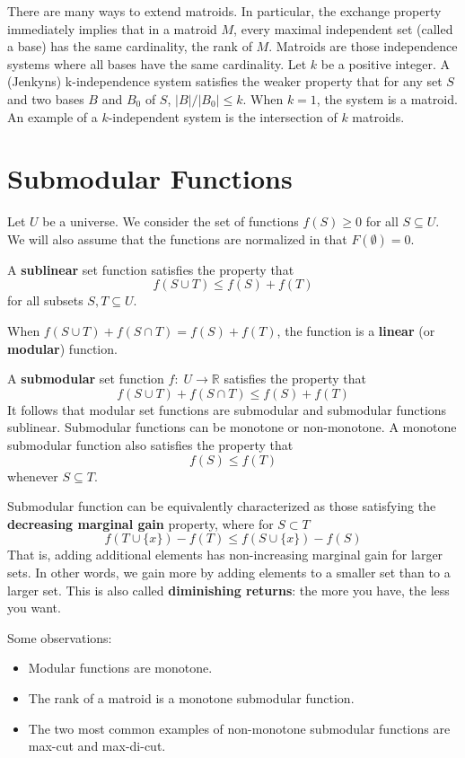 There are many ways to extend matroids. In particular, the exchange property immediately implies that in a matroid $M$, every maximal independent set (called a base) has the same cardinality, the rank of $M$. Matroids are those independence systems where all bases have the same cardinality. Let $k$ be a positive integer. A (Jenkyns) k-independence system satisfies the weaker property that for any set $S$ and two bases $B$ and $B_0$ of $S$, $|B|/|B_0| \leq k$. When $k=1$, the system is a matroid. An example of a $k$-independent system is the intersection of $k$ matroids.

\section{Submodular Functions}

Let $U$ be a universe. We consider the set of functions $f(S) \geq 0$ for all $S \subseteq U$. We will also assume that the functions are normalized in that $F(\emptyset) = 0$.

A \textbf{sublinear} set function satisfies the property that
$$
f(S \cup T) \leq f(S) + f(T)
$$
for all subsets $S,T \subseteq U$.

When $f(S \cup T) + f(S \cap T) = f(S) + f(T)$, the function is a \textbf{linear} (or \textbf{modular}) function.

A \textbf{submodular} set function $f:\; U \to \mathbb{R}$ satisfies the property that
$$
f(S \cup T) + f(S \cap T) \leq f(S) + f(T)
$$
It follows that modular set functions are submodular and submodular functions sublinear. Submodular functions can be monotone or non-monotone. A monotone submodular function also satisfies the property that
$$
f(S) \leq f(T)
$$
whenever $S \subseteq T$.

Submodular function can be equivalently characterized as those satisfying the \textbf{decreasing marginal gain} property, where for $S \subset T$ 
$$
f(T \cup \{x\}) - f(T) \leq f(S \cup \{x\}) - f(S)
$$
That is, adding additional elements has non-increasing marginal gain for larger sets. In other words, we gain more by adding elements to a smaller set than to a larger set. This is also called \textbf{diminishing returns}: the more you have, the less you want.

Some observations:
\begin{itemize}
    \item Modular functions are monotone.
    \item The rank of a matroid is a monotone submodular function.
    \item The two most common examples of non-monotone submodular functions are max-cut and max-di-cut.
\end{itemize}

